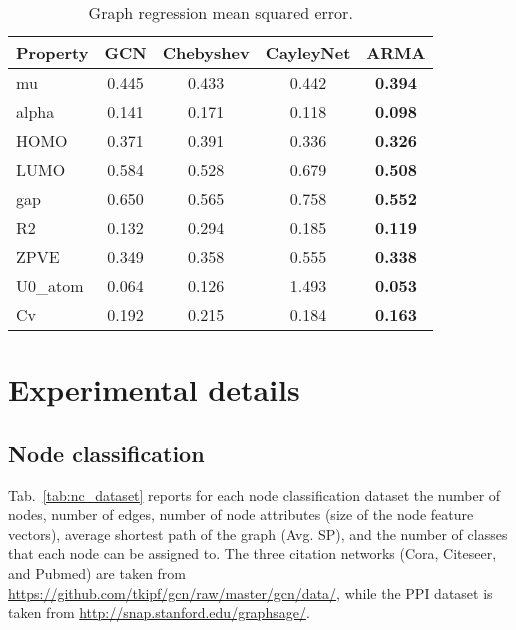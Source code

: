 \documentclass{article}
\begin{document}
\begin{table}
\caption{Graph regression mean squared error. }
\setlength\tabcolsep{.3em} \small
\centering
\bgroup
\def\arraystretch{1.0} \begin{tabular}{lcccc}
\cmidrule[1.5pt]{1-5}
\textbf{Property} & \textbf{GCN} & \textbf{Chebyshev} & \textbf{CayleyNet} & \textbf{ARMA} \\
\midrule
mu       & 0.445\tiny{} & 0.433\tiny{} & 0.442\tiny{} & \textbf{0.394\tiny{}} \\
alpha    & 0.141\tiny{} & 0.171\tiny{} & 0.118\tiny{} & \textbf{0.098\tiny{}} \\
HOMO     & 0.371\tiny{} & 0.391\tiny{} & 0.336\tiny{} & \textbf{0.326\tiny{}} \\
LUMO     & 0.584\tiny{} & 0.528\tiny{} & 0.679\tiny{} & \textbf{0.508\tiny{}} \\
gap      & 0.650\tiny{} & 0.565\tiny{} & 0.758\tiny{} & \textbf{0.552\tiny{}} \\
R2       & 0.132\tiny{} & 0.294\tiny{} & 0.185\tiny{} & \textbf{0.119\tiny{}} \\
ZPVE     & 0.349\tiny{} & 0.358\tiny{} & 0.555\tiny{} & \textbf{0.338\tiny{}} \\
U0\_atom & 0.064\tiny{} & 0.126\tiny{} & 1.493\tiny{} & \textbf{0.053\tiny{}} \\
Cv       & 0.192\tiny{} & 0.215\tiny{} & 0.184\tiny{} & \textbf{0.163\tiny{}} \\
\cmidrule[1.5pt]{1-5}
\end{tabular}
\egroup
\label{tab:gr_res}
\end{table}




\section{Experimental details}
\label{sec:details}

\subsection{Node classification}

Tab.~\ref{tab:nc_dataset} reports for each node classification dataset the number of nodes, number of edges, number of node attributes (size of the node feature vectors), average shortest path of the graph (Avg. SP), and the number of classes that each node can be assigned to.
The three citation networks (Cora, Citeseer, and Pubmed) are taken from \url{https://github.com/tkipf/gcn/raw/master/gcn/data/}, while the PPI dataset is taken from \url{http://snap.stanford.edu/graphsage/}.
\end{document}
